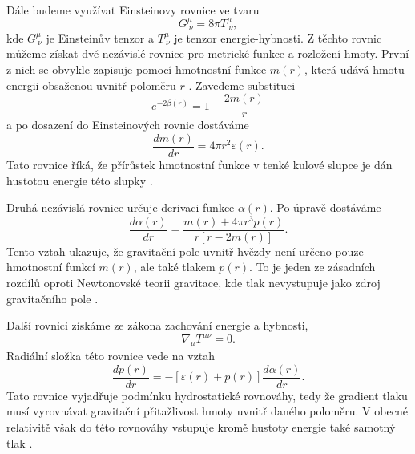 \documentclass[%
final%
,htext%
]{ipothes}
\begin{document}
Dále budeme využívat Einsteinovy rovnice ve tvaru
\begin{equation}
    G^\mu_{\ \nu} = 8\pi T^\mu_{\ \nu},
    \label{eq:einstein_equations_geometrized}
\end{equation}
kde $G^\mu_{\ \nu}$ je Einsteinův tenzor a $T^\mu_{\ \nu}$ je tenzor energie-hybnosti. Z těchto rovnic můžeme získat dvě nezávislé rovnice pro metrické funkce a rozložení hmoty. První z nich se obvykle zapisuje pomocí hmotnostní funkce $m(r)$, která udává hmotu-energii obsaženou uvnitř poloměru $r$ \cite{ghosh2007}. Zavedeme substituci
\begin{equation}
    e^{-2\beta(r)}
    =
    1 - \frac{2m(r)}{r}
    \label{eq:mass_function_metric}
\end{equation}
a po dosazení do Einsteinových rovnic dostáváme
\begin{equation}
    \frac{dm(r)}{dr}
    =
    4\pi r^2 \varepsilon(r).
    \label{eq:mass_equation_geometrized}
\end{equation}
Tato rovnice říká, že přírůstek hmotnostní funkce v tenké kulové slupce je dán hustotou energie této slupky \cite{vidana2020}.

Druhá nezávislá rovnice určuje derivaci funkce $\alpha(r)$. Po úpravě dostáváme
\begin{equation}
    \frac{d\alpha(r)}{dr}
    =
    \frac{m(r) + 4\pi r^3 p(r)}
    {r\left[r-2m(r)\right]}.
    \label{eq:alpha_derivative}
\end{equation}
Tento vztah ukazuje, že gravitační pole uvnitř hvězdy není určeno pouze hmotnostní funkcí $m(r)$, ale také tlakem $p(r)$. To je jeden ze zásadních rozdílů oproti Newtonovské teorii gravitace, kde tlak nevystupuje jako zdroj gravitačního pole \cite{ghosh2007}.

Další rovnici získáme ze zákona zachování energie a hybnosti,
\begin{equation}
    \nabla_\mu T^{\mu\nu} = 0.
    \label{eq:stress_energy_conservation}
\end{equation}
Radiální složka této rovnice vede na vztah
\begin{equation}
    \frac{dp(r)}{dr}
    =
    -\left[\varepsilon(r)+p(r)\right]
    \frac{d\alpha(r)}{dr}.
    \label{eq:hydrostatic_alpha}
\end{equation}
Tato rovnice vyjadřuje podmínku hydrostatické rovnováhy, tedy že gradient tlaku musí vyrovnávat gravitační přitažlivost hmoty uvnitř daného poloměru. V obecné relativitě však do této rovnováhy vstupuje kromě hustoty energie také samotný tlak \cite{vidana2020}.
\end{document}
